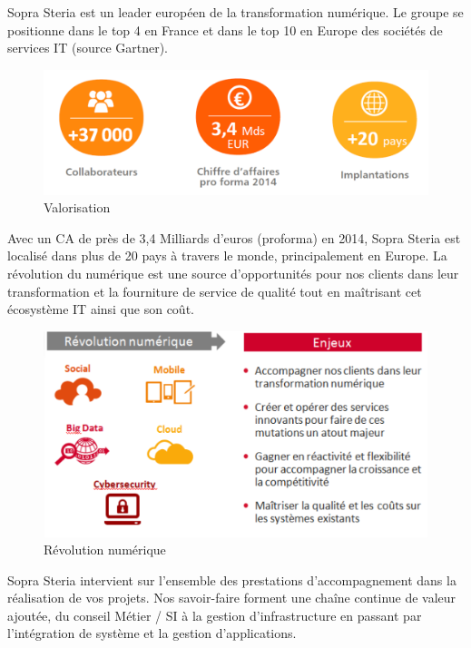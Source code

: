 \documentclass[a4paper]{memoir}
\begin{document}
Sopra Steria est un leader européen de la transformation numérique. Le groupe se positionne dans le top 4
en France et dans le top 10 en Europe des sociétés de services IT (source Gartner).

\begin{figure}[!ht]
    \center
    \includegraphics[width=1\textwidth]{./images/sopra2.png}
    \caption{Valorisation}
    \label{Sopra+Steria+chiffre}
\end{figure}

Avec un CA de près de 3,4 Milliards d’euros (proforma) en 2014, Sopra Steria est localisé dans plus de 20
pays à travers le monde, principalement en Europe.
La révolution du numérique est une source d’opportunités pour nos clients dans leur transformation et la
fourniture de service de qualité tout en maîtrisant cet écosystème IT ainsi que son coût.

\begin{figure}[!ht]
    \center
    \includegraphics[width=1\textwidth]{./images/sopra3.png}
    \caption{Révolution numérique}
    \label{Révolution numérique}
\end{figure}

Sopra Steria intervient sur l’ensemble des prestations d’accompagnement dans la réalisation de vos projets.
Nos savoir-faire forment une chaîne continue de valeur ajoutée, du conseil Métier / SI à la gestion
d’infrastructure en passant par l’intégration de système et la gestion d’applications.
\end{document}
